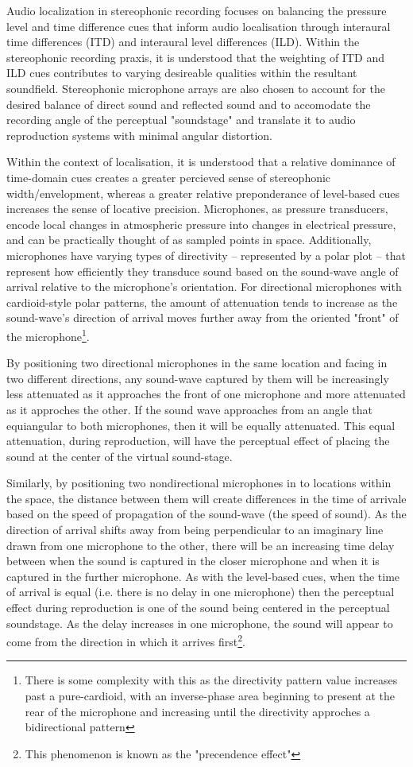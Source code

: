 Audio localization in stereophonic recording focuses on balancing the pressure level and time difference cues that inform audio localisation through interaural time differences (ITD) and interaural level differences (ILD). Within the stereophonic recording praxis, it is understood that the weighting of ITD and ILD cues contributes to varying desireable qualities within the resultant soundfield. Stereophonic microphone arrays are also chosen to account for the desired balance of direct sound and reflected sound and to accomodate the recording angle of the perceptual "soundstage" and translate it to audio reproduction systems with minimal angular distortion.

Within the context of localisation, it is understood that a relative dominance of time-domain cues creates a greater percieved sense of stereophonic width/envelopment, whereas a greater relative preponderance of level-based cues increases the sense of locative precision. Microphones, as pressure transducers, encode local changes in atmospheric pressure into changes in electrical pressure, and can be practically thought of as sampled points in space. Additionally, microphones have varying types of directivity -- represented by a polar plot -- that represent how efficiently they transduce sound based on the sound-wave angle of arrival relative to the microphone's orientation. For directional microphones with cardioid-style polar patterns, the amount of attenuation tends to increase as the sound-wave's direction of arrival moves further away from the oriented "front" of the microphone\footnote{There is some complexity with this as the directivity pattern value increases past a pure-cardioid, with an inverse-phase area beginning to present at the rear of the microphone and increasing until the directivity approches a bidirectional pattern}.

By positioning two directional microphones in the same location and facing in two different directions, any sound-wave captured by them will be increasingly less attenuated as it approaches the front of one microphone and more attenuated as it approches the other. If the sound wave approaches from an angle that equiangular to both microphones, then it will be equally attenuated. This equal attenuation, during reproduction, will have the perceptual effect of placing the sound at the center of the virtual sound-stage. 

Similarly, by positioning two nondirectional microphones in to locations within the space, the distance between them will create differences in the time of arrivale based on the speed of propagation of the  sound-wave (the speed of sound). As the direction of arrival shifts away from being perpendicular to an imaginary line drawn from one microphone to the other, there will be an increasing time delay between when the sound is captured in the closer microphone and when it is captured in the further microphone. As with the level-based cues, when the time of arrival is equal (i.e. there is no delay in one microphone) then the perceptual effect during reproduction is one of the sound being centered in the perceptual soundstage. As the delay increases in one microphone, the sound will appear to come from the direction in which it arrives first\footnote{This phenomenon is known as the "precendence effect"}.